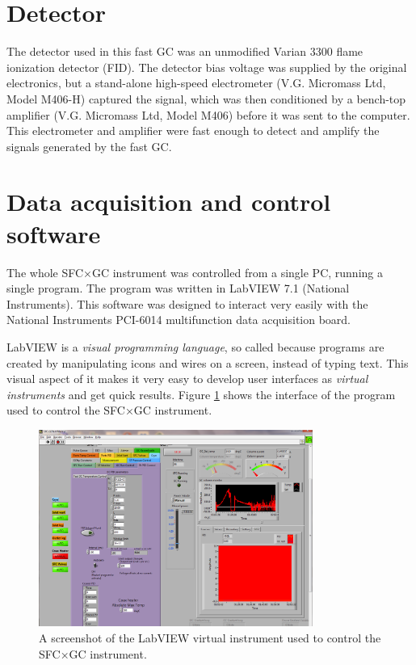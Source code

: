 \section{Detector}

The detector used in this fast GC was an unmodified Varian\texttrademark{} 3300
flame ionization detector (FID). The detector bias voltage was supplied by the
original electronics, but a stand-alone high-speed electrometer (V.G. Micromass
Ltd, Model M406-H) captured the signal, which was then conditioned by a
bench-top amplifier (V.G. Micromass Ltd, Model M406) before it was sent to the
computer. This electrometer and amplifier were fast enough to detect and amplify
the signals generated by the fast GC.

\section{Data acquisition and control software}

The whole SFC×GC instrument was controlled from a single PC, running a single
program. The program was written in LabVIEW 7.1\texttrademark{} (National
Instruments). This software was designed to interact very easily with the
National Instruments PCI-6014 multifunction data acquisition board.

LabVIEW is a \textit{visual programming language}, so called because programs
are created by manipulating icons and wires on a screen, instead of typing text.
This visual aspect of it makes it very easy to develop user interfaces as
\textit{virtual instruments} and get quick results. Figure \ref{fig:SFCGCFastVI}
shows the interface of the program used to control the SFC×GC instrument.

\begin{figure}
	\centering
	\includegraphics[width=0.8\textwidth]{Figures/Screenshot.png}
	\decoRule
	
	\caption[The main LabVIEW VI]{A screenshot of the LabVIEW virtual instrument
	used to control the SFC×GC instrument.}
	
	\label{fig:SFCGCFastVI}
\end{figure}


